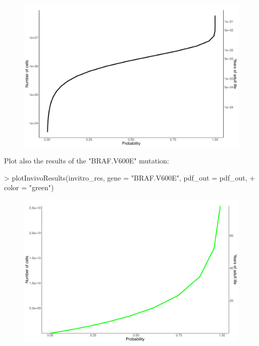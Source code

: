 \documentclass{article}
\begin{document}
\begin{figure}[H]
\begin{center}
\includegraphics[width=1.0\textwidth]{invivo_all}
\end{center}
\end{figure}

Plot also the results of the "BRAF.V600E" mutation:

\begin{Schunk}
\begin{Sinput}
> plotInvivoResults(invitro_res, gene = "BRAF.V600E", pdf_out = pdf_out,
+                   color = "green")
\end{Sinput}
\end{Schunk}


\begin{figure}[H]
\begin{center}
\includegraphics[width=1.0\textwidth]{invivo_BRAF}
\end{center}
\end{figure}
\end{document}

